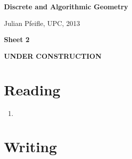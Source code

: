 \documentclass[11pt]{amsart}
\begin{document}
\begin{center}
\textbf{\sffamily
   Discrete and Algorithmic Geometry }

\medskip
   Julian Pfeifle,
   UPC, 2013 \mbox{}
\end{center}

\bigskip

\begin{center}
  \textbf{\sffamily Sheet 2}

\bigskip
\textbf{\sffamily UNDER CONSTRUCTION}

\end{center}

\bigskip
\bigskip
\bigskip

\section*{Reading}

\begin{enumerate}
\setlength{\itemsep}{2ex}

\item
\end{enumerate}

\bigskip
\bigskip
\section*{Writing}
\end{document}

